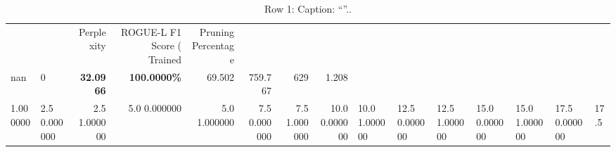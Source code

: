\begin{table}
\caption{Row 1\ifshowcaption{}: Caption: ``''.\else.\fi}
\label{tab:evaluation-pipeline-1}
\begin{tabular}{llrrrrrr}
 &  & Perplexity & ROGUE-L F1 Score (%
Trained & Pruning Percentage &  &  &  &  &  &  \\
nan & 0 & \bfseries 32.0966 & \bfseries 100.0000\% & 69.502 & 759.767 & 629 & 1.208 \\
1.000000 & 2.5%
0.000000 & 2.5%
1.000000 & 5.0%
0.000000 & 5.0%
1.000000 & 7.5%
0.000000 & 7.5%
1.000000 & 10.0%
0.000000 & 10.0%
1.000000 & 12.5%
0.000000 & 12.5%
1.000000 & 15.0%
0.000000 & 15.0%
1.000000 & 17.5%
0.000000 & 17.5%

\end{tabular}
\end{table}
